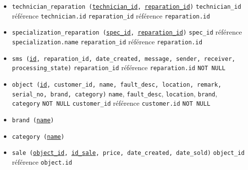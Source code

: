 \documentclass{article}
\newcommand{\ul}{\underline}
\newcommand{\ttt}{\texttt}
\begin{document}
\begin{itemize}
    \item \ttt{technician\_reparation (\ul{technician\_id}, \ul{reparation\_id})}
    \subitem \ttt{technician\_id} référence \ttt{technician.id} 
    \subitem \ttt{reparation\_id} référence \ttt{reparation.id}

    \item \ttt{specialization\_reparation (\ul{spec\_id}, \ul{reparation\_id})}
    \subitem \ttt{spec\_id} référence \ttt{specialization.name}
    \subitem \ttt{reparation\_id} référence \ttt{reparation.id}

    \item \ttt{sms (\ul{id}, reparation\_id, date\_created, message, sender, receiver, processing\_state)}
    \subitem \ttt{reparation\_id} référence \ttt{reparation.id} \ttt{NOT NULL}

    \item \ttt{object (\ul{id}, customer\_id, name, fault\_desc, location, remark, serial\_no, brand, category)}
    \subitem \ttt{name}, \ttt{fault\_desc}, \ttt{location}, \ttt{brand}, \ttt{category} \ttt{NOT NULL}
    \subitem \ttt{customer\_id} référence \ttt{customer.id} \ttt{NOT NULL}

    \item \ttt{brand (\ul{name})}
    \item \ttt{category (\ul{name})}
    \item \ttt{sale (\ul{object\_id}, \ul{id\_sale}, price, date\_created, date\_sold)}
    \subitem \ttt{object\_id} référence \ttt{object.id}

\end{itemize}


\pagebreak
\end{document}
